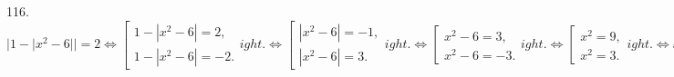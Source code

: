 116. $|1-|x^2-6||=2\Leftrightarrow \left[\begin{array}{l}1-|x^2-6|=2,\\ 1-|x^2-6|=-2.\end{array}
ight. \Leftrightarrow \left[\begin{array}{l}|x^2-6|=-1,\\ |x^2-6|=3.\end{array}
ight.\Leftrightarrow \left[\begin{array}{l}x^2-6=3,\\ x^2-6=-3.\end{array}
ight.\Leftrightarrow \left[\begin{array}{l}x^2=9,\\ x^2=3.\end{array}
ight.\Leftrightarrow x\in\{\pm\sqrt{3};\pm3\}.$\\
